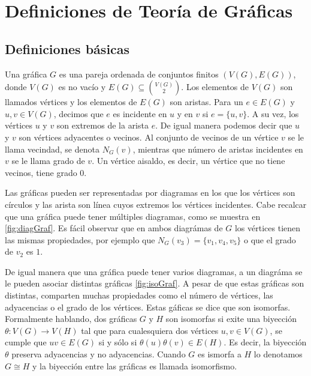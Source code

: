 \chapter{Definiciones de Teor\'ia de Gr\'aficas}%
\label{cap:defs grafs}

\section{Definiciones b\'asicas}%
\label{sec:def-basicas}

Una gr\'afica $G$ es una pareja ordenada de conjuntos finitos $(V(G), E(G))$,
donde $V(G)$ es no vac\'io y $E(G) \subseteq \binom{V(G)}{2}$. Los elementos de
$V(G)$ son llamados v\'ertices y los elementos de $E(G)$ son aristas. Para un $e
\in E(G)$ y $u,v \in V(G)$, decimos que $e$ es incidente en $u$ y en $v$ si $e=
\{u, v\}$. A su vez, los v\'ertices $u$ y $v$ son extremos de la arista $e$. De
igual manera podemos decir que $u$ y $v$ son v\'ertices adyacentes o vecinos. Al
conjunto de vecinos de un v\'ertice $v$ se le llama vecindad, se denota
$N_G(v)$, mientras que n\'umero de aristas incidentes en $v$ se le llama grado
de $v$. Un v\'ertice aisaldo, es decir, un v\'ertice que no tiene vecinos, tiene
grado $0$.

Las gr\'aficas pueden ser representadas por diagramas en los que los v\'ertices
son c\'irculos y las arista son l\'inea cuyos extremos los v\'ertices
incidentes. Cabe recalcar que una gr\'afica puede tener  m\'ultiples diagramas,
como se muestra en \cref{fig:diagGraf}. Es f\'acil observar que en ambos
diagr\'amas de $G$ los v\'ertices tienen las mismas propiedades, por ejemplo
que $N_G(v_3)=\{v_1,v_4,v_5\}$ o que el grado de $v_2$ es $1$.

De igual manera que una gr\'afica puede tener varios diagramas, a un diagr\'ama
se le pueden asociar distintas gr\'aficas \cref{fig:isoGraf}. A pesar de que
estas gr\'aficas son distintas, comparten muchas propiedades como el n\'umero de
v\'ertices, las adyacencias o el grado de los v\'ertices. Estas g\'aficas se
dice que son isomorfas. Formalmente hablando, dos gr\'aficas $G$ y $H$ son
isomorfas si exite una biyecci\'on $\theta: V(G) \rightarrow V(H)$ tal que para
cualesquiera dos v\'ertices $u, v \in V(G)$, se cumple que $uv \in E(G)$ si y
s\'olo si $\theta(u)\theta(v) \in E(H)$. Es decir, la biyecci\'on $\theta$
preserva adyacencias y no adyacencias. Cuando $G$ es ismorfa a $H$ lo denotamos
$G \cong H$ y la biyecci\'on entre las gr\'aficas es llamada isomorfismo.

